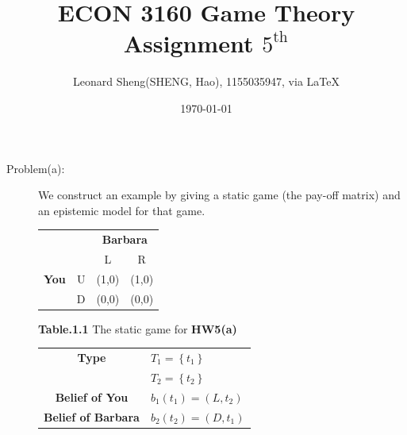 \documentclass{article}
\begin{document}
\title{ECON 3160 Game Theory \\Assignment $5^{\text{th}}$}
\author{{\normalsize Leonard Sheng(SHENG, Hao), 1155035947, via \LaTeX}}
\date{\today}

\maketitle

\def \Pr{{\rm Pr}}

\baselineskip 0.6cm
\begin{description}
    \item[Problem(a):]We construct an example by giving a static game (the pay-off matrix) and an epistemic model for that game.
    \begin{center}
        \begin{tabular}{rrcc}

                   &            & \multicolumn{ 2}{c}{{\bf Barbara}} \\

                   &            &          L &          R \\

        \multicolumn{ 1}{c}{{\bf You}} &          U &      (1,0) &      (1,0) \\

        \multicolumn{ 1}{c}{{\bf }} &          D &      (0,0) &      (0,0) \\

        \end{tabular}

        {\bf Table.1.1 }The static game for {\bf HW5(a)}
    \end{center}


    \begin{center}
        \begin{tabular}{cl}
        \hline
        \hline
        \multicolumn{ 1}{c}{{\bf Type}} & $T_1=\left\{t_1\right\}$ \\

        \multicolumn{ 1}{c}{{\bf }} & $T_2=\left\{t_2\right\}$ \\
        \hline
        {\bf Belief of You} & $b_1\left(t_1\right)=\left(L,t_2\right)$ \\
        \hline
        {\bf Belief of Barbara} & $b_2\left(t_2\right)=\left(D,t_1\right)$ \\
        \hline
        \hline
        \end{tabular}


\end{center}
\end{description}
\end{document}

